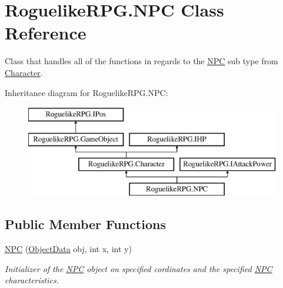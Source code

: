 \hypertarget{class_roguelike_r_p_g_1_1_n_p_c}{}\section{Roguelike\+R\+P\+G.\+N\+PC Class Reference}
\label{class_roguelike_r_p_g_1_1_n_p_c}


Class that handles all of the functions in regards to the \mbox{\hyperlink{class_roguelike_r_p_g_1_1_n_p_c}{N\+PC}} sub type from \mbox{\hyperlink{class_roguelike_r_p_g_1_1_character}{Character}}.  


Inheritance diagram for Roguelike\+R\+P\+G.\+N\+PC\+:\begin{figure}[H]
\begin{center}
\leavevmode
\includegraphics[height=4.000000cm]{class_roguelike_r_p_g_1_1_n_p_c}
\end{center}
\end{figure}
\subsection*{Public Member Functions}
\begin{DoxyCompactItemize}
\item 
\mbox{\hyperlink{class_roguelike_r_p_g_1_1_n_p_c_a2df0707bbdfb1078c414b87a1dd4cf5c}{N\+PC}} (\mbox{\hyperlink{struct_roguelike_r_p_g_1_1_object_data}{Object\+Data}} obj, int x, int y)
\begin{DoxyCompactList}\small\item\em Initializer of the \mbox{\hyperlink{class_roguelike_r_p_g_1_1_n_p_c}{N\+PC}} object on specified cordinates and the specified \mbox{\hyperlink{class_roguelike_r_p_g_1_1_n_p_c}{N\+PC}} characteristics. \end{DoxyCompactList}\end{DoxyCompactItemize}
